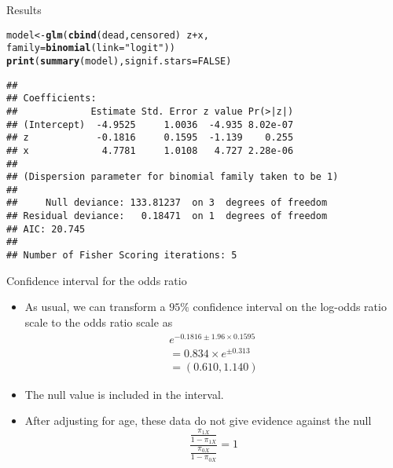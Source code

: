 \documentclass[10pt,handout]{beamer}\usepackage[]{graphicx}\usepackage[]{color}
\makeatletter
\newcommand{\hlnum}[1]{\textcolor[rgb]{0.686,0.059,0.569}{#1}}%
\newcommand{\hlstr}[1]{\textcolor[rgb]{0.192,0.494,0.8}{#1}}%
\newcommand{\hlopt}[1]{\textcolor[rgb]{0,0,0}{#1}}%
\newcommand{\hlstd}[1]{\textcolor[rgb]{0.345,0.345,0.345}{#1}}%
\newcommand{\hlkwb}[1]{\textcolor[rgb]{0.69,0.353,0.396}{#1}}%
\newcommand{\hlkwc}[1]{\textcolor[rgb]{0.333,0.667,0.333}{#1}}%
\newcommand{\hlkwd}[1]{\textcolor[rgb]{0.737,0.353,0.396}{\textbf{#1}}}%
\newenvironment{kframe}{%
 \def\at@end@of@kframe{}%
 \ifinner\ifhmode%
  \def\at@end@of@kframe{\end{minipage}}%
  \begin{minipage}{\columnwidth}%
 \fi\fi%
 \def\FrameCommand##1{\hskip\@totalleftmargin \hskip-\fboxsep
 \colorbox{shadecolor}{##1}\hskip-\fboxsep
     \hskip-\linewidth \hskip-\@totalleftmargin \hskip\columnwidth}%
 \MakeFramed {\advance\hsize-\width
   \@totalleftmargin\z@ \linewidth\hsize
   \@setminipage}}%
 {\par\unskip\endMakeFramed%
 \at@end@of@kframe}
\newenvironment{knitrout}{}{} %
\makeatother
\begin{document}
\begin{frame}[fragile]{Results}
\begin{knitrout}
\color{fgcolor}\begin{kframe}
\begin{alltt}
\hlstd{model} \hlkwb{<-} \hlkwd{glm}\hlstd{(}\hlkwd{cbind}\hlstd{(dead,censored)} \hlopt{~} \hlstd{z} \hlopt{+} \hlstd{x,}
              \hlkwc{family}\hlstd{=}\hlkwd{binomial}\hlstd{(}\hlkwc{link}\hlstd{=}\hlstr{"logit"}\hlstd{))}
\hlkwd{print}\hlstd{(}\hlkwd{summary}\hlstd{(model),} \hlkwc{signif.stars} \hlstd{=} \hlnum{FALSE}\hlstd{)}
\end{alltt}
\begin{verbatim}
## 
## Coefficients:
##             Estimate Std. Error z value Pr(>|z|)
## (Intercept)  -4.9525     1.0036  -4.935 8.02e-07
## z            -0.1816     0.1595  -1.139    0.255
## x             4.7781     1.0108   4.727 2.28e-06
## 
## (Dispersion parameter for binomial family taken to be 1)
## 
##     Null deviance: 133.81237  on 3  degrees of freedom
## Residual deviance:   0.18471  on 1  degrees of freedom
## AIC: 20.745
## 
## Number of Fisher Scoring iterations: 5
\end{verbatim}
\end{kframe}
\end{knitrout}
\end{frame}



\begin{frame}[fragile]{Confidence interval for the odds ratio}
	\begin{itemize}
		\item As usual, we can transform a $95 \%$ confidence interval on the log-odds ratio scale to the odds ratio scale as
		$$
		\begin{array}{l}
		e^{-0.1816 \pm 1.96 \times 0.1595} \\
		=0.834 \times e^{\pm 0.313} \\
		=(0.610,1.140)
		\end{array}
		$$
		\item The null value is included in the interval.
		\item After adjusting for age, these data do not give evidence against the null
		$$
		\frac{\frac{\pi_{1 X}}{1-\pi_{1 X}}}{\frac{\pi_{0 X}}{1-\pi_{0 X}}}=1
		$$
	\end{itemize}
\end{frame}
\end{document}
